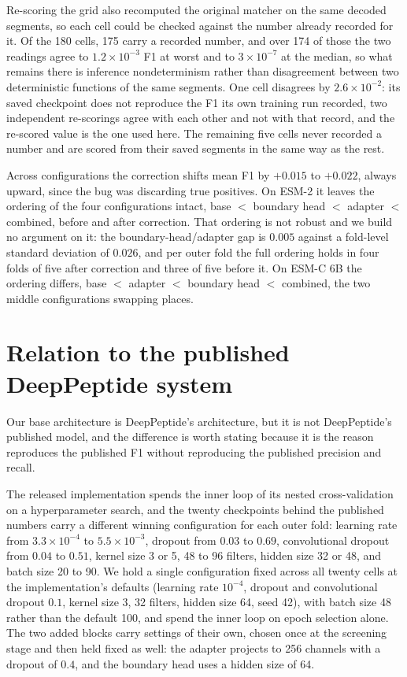 \documentclass{article}
\begin{document}
Re-scoring the grid also recomputed the original matcher on the same decoded segments, so each cell could be checked against the number already recorded for it. Of the 180 cells, 175 carry a recorded number, and over 174 of those the two readings agree to $1.2\times10^{-3}$ F1 at worst and to $3\times10^{-7}$ at the median, so what remains there is inference nondeterminism rather than disagreement between two deterministic functions of the same segments. One cell disagrees by $2.6\times10^{-2}$: its saved checkpoint does not reproduce the F1 its own training run recorded, two independent re-scorings agree with each other and not with that record, and the re-scored value is the one used here. The remaining five cells never recorded a number and are scored from their saved segments in the same way as the rest.

Across configurations the correction shifts mean F1 by $+0.015$ to $+0.022$, always upward, since the bug was discarding true positives. On ESM-2 it leaves the ordering of the four configurations intact, base $<$ boundary head $<$ adapter $<$ combined, before and after correction. That ordering is not robust and we build no argument on it: the boundary-head/adapter gap is $0.005$ against a fold-level standard deviation of $0.026$, and per outer fold the full ordering holds in four folds of five after correction and three of five before it. On ESM-C 6B the ordering differs, base $<$ adapter $<$ boundary head $<$ combined, the two middle configurations swapping places.


\FloatBarrier

\section{Relation to the published DeepPeptide system}
\label{sec:app-upstream}

Our base architecture is DeepPeptide's architecture, but it is not DeepPeptide's published model,
and the difference is worth stating because it is the reason  reproduces the
published F1 without reproducing the published precision and recall.

The released implementation spends the inner loop of its nested cross-validation on a
hyperparameter search, and the twenty checkpoints behind the published numbers carry a different
winning configuration for each outer fold: learning rate from $3.3\times10^{-4}$ to
$5.5\times10^{-3}$, dropout from $0.03$ to $0.69$, convolutional dropout from $0.04$ to $0.51$,
kernel size 3 or 5, 48 to 96 filters, hidden size 32 or 48, and batch size 20 to 90. We hold a
single configuration fixed across all twenty cells at the implementation's defaults (learning rate
$10^{-4}$, dropout and convolutional dropout $0.1$, kernel size 3, 32 filters, hidden size 64, seed 42), with batch size
48 rather than the default 100, and spend the inner loop on epoch selection alone. The two added
blocks carry settings of their own, chosen once at the screening stage and then held fixed as well:
the adapter projects to 256 channels with a dropout of $0.4$, and the boundary head uses a hidden
size of 64.
\end{document}
